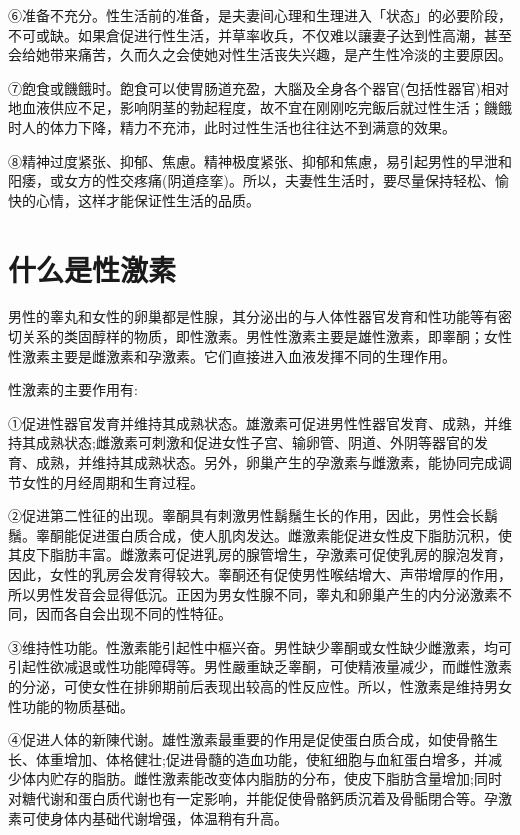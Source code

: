 \documentclass[12pt,UTF8]{ctexbook}
\begin{document}
⑥准备不充分。性生活前的准备，是夫妻间心理和生理进入「状态」的必要阶段，不可或缺。如果倉促进行性生活，并草率收兵，不仅难以讓妻子达到性高潮，甚至会给她带来痛苦，久而久之会使她对性生活丧失兴趣，是产生性冷淡的主要原因。

⑦飽食或饑餓时。飽食可以使胃肠道充盈，大腦及全身各个器官(包括性器官)相对地血液供应不足，影响阴茎的勃起程度，故不宜在刚刚吃完飯后就过性生活；饑餓时人的体力下降，精力不充沛，此时过性生活也往往达不到满意的效果。

⑧精神过度紧张、抑郁、焦慮。精神极度紧张、抑郁和焦慮，易引起男性的早泄和阳痿，或女方的性交疼痛(阴道痉挛)。所以，夫妻性生活时，要尽量保持轻松、愉快的心情，这样才能保证性生活的品质。

\section{什么是性激素}

男性的睾丸和女性的卵巢都是性腺，其分泌出的与人体性器官发育和性功能等有密切关系的类固醇样的物质，即性激素。男性性激素主要是雄性激素，即睾酮；女性性激素主要是雌激素和孕激素。它们直接进入血液发揮不同的生理作用。

性激素的主要作用有:

①促进性器官发育并维持其成熟状态。雄激素可促进男性性器官发育、成熟，并维持其成熟状态;雌激素可刺激和促进女性子宫、输卵管、阴道、外阴等器官的发育、成熟，并维持其成熟状态。另外，卵巢产生的孕激素与雌激素，能协同完成调节女性的月经周期和生育过程。

②促进第二性征的出现。睾酮具有刺激男性鬍鬚生长的作用，因此，男性会长鬍鬚。睾酮能促进蛋白质合成，使人肌肉发达。雌激素能促进女性皮下脂肪沉积，使其皮下脂肪丰富。雌激素可促进乳房的腺管增生，孕激素可促使乳房的腺泡发育，因此，女性的乳房会发育得较大。睾酮还有促使男性喉结增大、声带增厚的作用，所以男性发音会显得低沉。正因为男女性腺不同，睾丸和卵巢产生的内分泌激素不同，因而各自会出现不同的性特征。

③维持性功能。性激素能引起性中樞兴奋。男性缺少睾酮或女性缺少雌激素，均可引起性欲减退或性功能障碍等。男性嚴重缺乏睾酮，可使精液量减少，而雌性激素的分泌，可使女性在排卵期前后表现出较高的性反应性。所以，性激素是维持男女性功能的物质基础。

④促进人体的新陳代谢。雄性激素最重要的作用是促使蛋白质合成，如使骨骼生长、体重增加、体格健壮;促进骨髓的造血功能，使紅细胞与血紅蛋白增多，并减少体内贮存的脂肪。雌性激素能改变体内脂肪的分布，使皮下脂肪含量增加;同时对糖代谢和蛋白质代谢也有一定影响，并能促使骨骼鈣质沉着及骨骺閉合等。孕激素可使身体内基础代谢增强，体温稍有升高。
\end{document}
